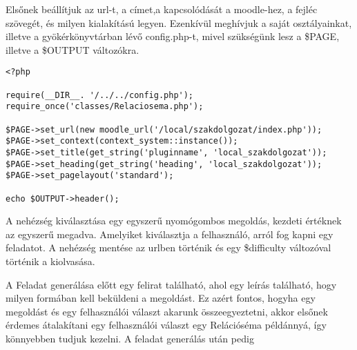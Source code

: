 Elsőnek beállítjuk az url-t, a címet,a kapcsolódását a moodle-hez, a fejléc szövegét, és milyen kialakítású legyen.
Ezenkívül meghívjuk a saját osztályainkat, illetve a gyökérkönyvtárban lévő config.php-t, mivel szükségünk lesz a \$PAGE, illetve a \$OUTPUT változókra. 
\begin{lstlisting}
<?php

require(__DIR__. '/../../config.php');
require_once('classes/Relaciosema.php');

$PAGE->set_url(new moodle_url('/local/szakdolgozat/index.php'));
$PAGE->set_context(context_system::instance());
$PAGE->set_title(get_string('pluginname', 'local_szakdolgozat'));
$PAGE->set_heading(get_string('heading', 'local_szakdolgozat'));
$PAGE->set_pagelayout('standard');

echo $OUTPUT->header();
\end{lstlisting}

A nehézség kiválasztása egy egyszerű nyomógombos megoldás, kezdeti értéknek az egyszerű megadva. Amelyiket kiválasztja a felhasználó, arról fog kapni egy feladatot. A nehézség mentése az urlben történik és egy \$difficulty változóval történik a kiolvasása. \par

A Feladat generálása előtt egy felirat található, ahol egy leírás található, hogy milyen formában kell beküldeni a megoldást. Ez azért fontos, hogyha egy megoldást és egy felhasználói választ akarunk összeegyeztetni, akkor elsőnek érdemes átalakítani egy felhasználói választ egy Relációséma példánnyá, így könnyebben tudjuk kezelni. A feladat generálás után pedig 